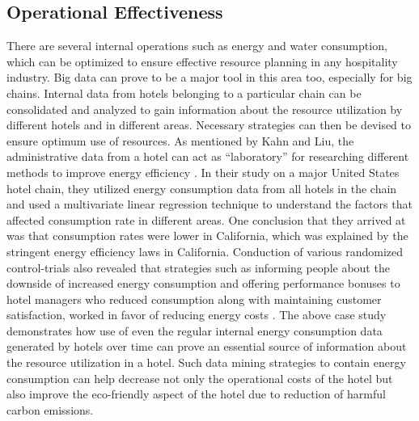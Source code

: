 \documentclass[sigconf]{acmart}
\begin{document}
\subsection{Operational Effectiveness}
There are several internal operations such as energy and water consumption, which can be optimized to ensure effective resource planning in any hospitality industry. Big data can prove to be a major tool in this area too, especially for big chains. Internal data from hotels belonging to a particular chain can be consolidated and analyzed to gain information about the resource utilization by different hotels and in different areas. Necessary strategies can then be devised to ensure optimum use of resources.
\newline As mentioned by Kahn and Liu, the administrative data from a hotel can act as ``laboratory'' for researching different methods to improve energy efficiency \cite {kahnliu10}. In their study on a major United States hotel chain, they utilized energy consumption data from all hotels in the chain and used a multivariate linear regression technique to understand the factors that affected consumption rate in different areas. One conclusion that they arrived at was that consumption rates were lower in California, which was explained by the stringent energy efficiency laws in California. Conduction of various randomized control-trials also revealed that strategies such as informing people about the downside of increased energy consumption and offering performance bonuses to hotel managers who reduced consumption along with maintaining customer satisfaction, worked in favor of reducing energy costs \cite {kahnliu10}.
\newline The above case study demonstrates how use of even the regular internal energy consumption data generated by hotels over time can prove an essential source of information about the resource utilization in a hotel. Such data mining strategies to contain energy consumption can help decrease not only the operational costs of the hotel but also improve the eco-friendly aspect of the hotel due to reduction of harmful carbon emissions.
\end{document}

